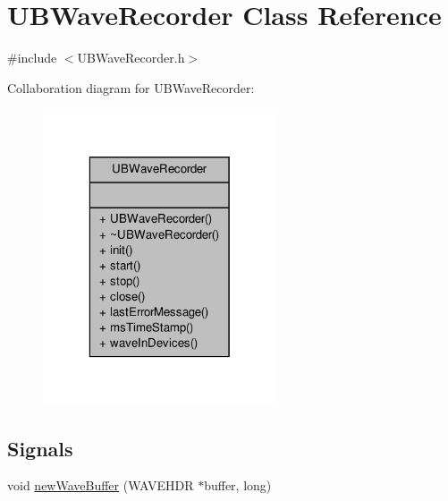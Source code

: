 \hypertarget{class_u_b_wave_recorder}{\section{U\-B\-Wave\-Recorder Class Reference}
\label{d3/d73/class_u_b_wave_recorder}
}


{\ttfamily \#include $<$U\-B\-Wave\-Recorder.\-h$>$}



Collaboration diagram for U\-B\-Wave\-Recorder\-:
\nopagebreak
\begin{figure}[H]
\begin{center}
\leavevmode
\includegraphics[width=196pt]{d3/dc9/class_u_b_wave_recorder__coll__graph}
\end{center}
\end{figure}
\subsection*{Signals}
\begin{DoxyCompactItemize}
\item 
void \hyperlink{class_u_b_wave_recorder_a4a856b9f77365a638191857455046bf7}{new\-Wave\-Buffer} (W\-A\-V\-E\-H\-D\-R $\ast$buffer, long)
\end{DoxyCompactItemize}
